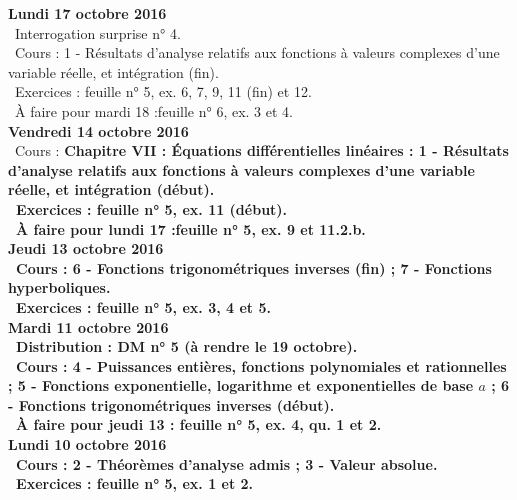 \documentclass[12pt,a4paper]{article}
\begin{document}
\noindent\textbf{Lundi 17 octobre 2016}\\
\bu\ Interrogation surprise n° 4.\\
\bu\ Cours : 1 - Résultats d'analyse relatifs aux fonctions à valeurs complexes d'une variable réelle, et 
intégration (fin).\\
\bu\ Exercices : feuille n° 5, ex. 6, 7, 9, 11 (fin) et 12.\\
\bu\ À faire pour mardi 18 :feuille n° 6, ex. 3 et 4.\vspace{.4cm}\\
   
\noindent\textbf{Vendredi 14 octobre 2016}\\
\bu\ Cours : \bf Chapitre VII \rm : Équations différentielles linéaires : 1 - Résultats d'analyse relatifs aux 
fonctions à valeurs complexes d'une variable réelle, et intégration (début).\\
\bu\ Exercices : feuille n° 5, ex. 11 (début).\\
\bu\ À faire pour lundi 17 :feuille n° 5, ex. 9 et 11.2.b.\vspace{.4cm}\\

\noindent\textbf{Jeudi 13 octobre 2016}\\
\bu\ Cours :  6 - Fonctions trigonométriques inverses (fin) ; 7 - Fonctions hyperboliques.\\
\bu\ Exercices : feuille n° 5, ex. 3, 4 et 5.\vspace{.4cm}\\

\noindent\textbf{\bf Mardi 11 octobre 2016}\\
\bu\ Distribution : DM n° 5 (à rendre le 19 octobre).\\
\bu\ Cours : 4 - Puissances entières, fonctions 
polynomiales et rationnelles ; 5 - Fonctions exponentielle, logarithme et 
exponentielles de base $a$ ; 6 - Fonctions trigonométriques inverses (début).\\
\bu\ À faire pour jeudi 13 : feuille n° 5, ex. 4, qu. 1 et 2.\vspace{.4cm}\\

\noindent\textbf{Lundi 10 octobre 2016}\\
\bu\ Cours :  2 - Théorèmes d'analyse admis ; 3 - Valeur absolue.\\
\bu\ Exercices : feuille n° 5, ex. 1 et 2.\vspace{.4cm}\\
   
\end{document}
